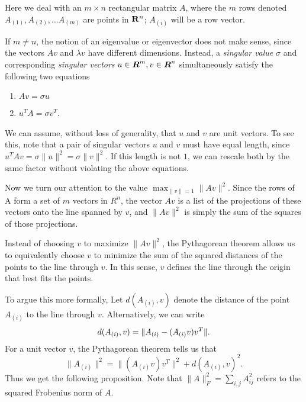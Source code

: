 \documentclass{book}
\numberwithin{exercise}{chapter}
\begin{document}
Here we deal with an $m \times n$ rectangular matrix $A$, where the $m$ rows
denoted $A_{(1)},A_{(2)},\ldots A_{(m)}$ are
points in ${\bf R}^n$; $A_{(i)}$ will be a row vector.

If $m\neq n$,
the notion of an eigenvalue or eigenvector does not make
sense, since the vectors $Av$ and $\lambda v$ have different dimensions.
Instead, a \emph{singular value} $\sigma$ and
corresponding \emph{singular vectors} $u \in \mbox{\mbox{\boldmath $R$}}^m, v \in \mbox{\mbox{\boldmath $R$}}^n$
simultaneously satisfy the following two equations
\begin{enumerate}
\item $Av = \sigma u$
\item $u^TA = \sigma v^T$.
\end{enumerate}


We can assume, without loss of generality, that $u$ and $v$ are unit
vectors. To see this, note that a pair of singular vectors $u$ and $v$
must have equal length, since $u^TAv = \sigma \|u\|^2 = \sigma \|v\|^2$.
If this length is not $1$, we can rescale both by the same
factor without violating the above equations.

Now we turn our attention to the value $\max_{\|v\| = 1}\|Av\|^2$.
Since the rows of A form a set of $m$ vectors in $R^n$, the vector $Av$
is a list of the projections of these vectors onto the line spanned by
$v$, and $\|Av\|^2$ is simply the sum of the squares of those
projections.

Instead of choosing $v$ to maximize $\|Av\|^2$, the Pythagorean
theorem allows us to equivalently choose $v$ to minimize the sum of
the squared distances of the points to the line through $v$.  In this
sense, $v$ defines the line through the origin that best fits the
points.


To argue this more formally,
Let $d(A_{(i)},v)$ denote the distance of the point
$A_{(i)}$ to the line through $v$.  Alternatively, we can write
\[
d(A_{(i)},v) = \|A_{(i)} - (A_{(i)}v)v^T\|.
\]
For a unit vector $v$, the Pythagorean theorem tells us that
\[
\|A_{(i)}\|^2 = \|(A_{(i)}v)v^T\|^2 + d(A_{(i)},v)^2.
\]
Thus we get the following proposition. Note that $\|A\|_F^2 = \sum_{i,j} A_{ij}^2$ refers to the
squared Frobenius norm of $A$.
\end{document}
